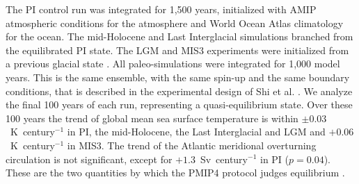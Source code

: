 \documentclass[pdflatex,sn-nature]{sn-jnl}
\begin{document}
The PI control run was integrated for 1,500 years, initialized with AMIP atmospheric conditions \cite{roeckner2004atmospheric} for the atmosphere and World Ocean Atlas climatology \cite{levitus2010world} for the ocean. The mid-Holocene and Last Interglacial simulations branched from the equilibrated PI state. The LGM and MIS3 experiments were initialized from a previous glacial state \cite{werner2016glacial}. All paleo-simulations were integrated for 1,000 model years. This is the same ensemble, with the same spin-up and the same boundary conditions, that is described in the experimental design of Shi et al. \cite{Shi2025GRL}. We analyze the final 100 years of each run, representing a quasi-equilibrium state. Over these 100 years the trend of global mean sea surface temperature is within $\pm0.03$~K~century$^{-1}$ in PI, the mid-Holocene, the Last Interglacial and LGM and $+0.06$~K~century$^{-1}$ in MIS3. The trend of the Atlantic meridional overturning circulation is not significant, except for $+1.3$~Sv~century$^{-1}$ in PI ($p = 0.04$). These are the two quantities by which the PMIP4 protocol judges equilibrium \cite{Kageyama2017}.
\end{document}
